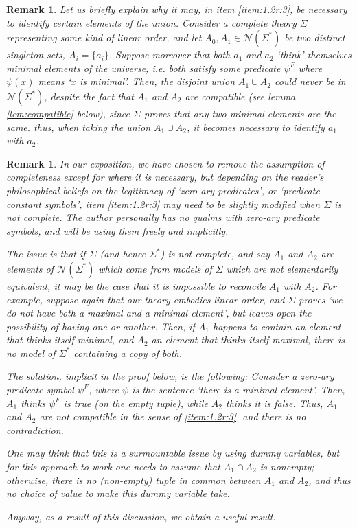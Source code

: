 \documentclass{article}
\newtheorem{remark}[theorem]{Remark}
\theoremstyle{nonumberplain}
\newcommand{\calN}{\mathcal{N}}
\begin{document}
\begin{remark}\label{rmk:whyid}
Let us briefly explain why it may, in item \ref{item:1.2r:3}, be necessary to identify certain elements of the union. Consider a complete theory $\Sigma$ representing some kind of linear order, and let $A_0, A_1 \in \calN(\Sigma^*)$ be two distinct singleton sets, $A_i = \{a_i\}$. Suppose moreover that both $a_1$ and $a_2$ `think' themselves minimal elements of the universe, i.e. both satisfy some predicate $\psi^F$ where $\psi(x)$ means `$x$ is minimal'. Then, the disjoint union $A_1 \cup A_2$ could never be in $\calN(\Sigma^*)$, despite the fact that $A_1$ and $A_2$ are compatible (see lemma \ref{lem:compatible} below), since $\Sigma$ proves that any two minimal elements are the same. thus, when taking the union $A_1 \cup A_2$, it becomes necessary to identify $a_1$ with $a_2$.
\end{remark}

\begin{remark}\label{rmk:compatible}
In our exposition, we have chosen to remove the assumption of completeness except for where it is necessary, but depending on the reader's philosophical beliefs on the legitimacy of `zero-ary predicates', or `predicate constant symbols', item \ref{item:1.2r:3} may need to be slightly modified when $\Sigma$ is not complete. The author personally has no qualms with zero-ary predicate symbols, and will be using them freely and implicitly.

The issue is that if $\Sigma$ (and hence $\Sigma^*$) is not complete, and say $A_1$ and $A_2$ are elements of $\calN(\Sigma^*)$ which come from models of $\Sigma$ which are \emph{not} elementarily equivalent, it may be the case that it is impossible to reconcile $A_1$ with $A_2$. For example, suppose again that our theory embodies linear order, and $\Sigma$ proves `we do not have both a maximal and a minimal element', but leaves open the possibility of having one or another. Then, if $A_1$ happens to contain an element that thinks itself minimal, and $A_2$ an element that thinks itself maximal, there is no model of $\Sigma^*$ containing a copy of both.

The solution, implicit in the proof below, is the following: Consider a zero-ary predicate symbol $\psi^F$, where $\psi$ is the sentence `there is a minimal element'. Then, $A_1$ thinks $\psi^F$ is true (on the empty tuple), while $A_2$ thinks it is false. Thus, $A_1$ and $A_2$ are not compatible in the sense of \ref{item:1.2r:3}, and there is no contradiction.

One may think that this is a surmountable issue by using dummy variables, but for this approach to work one needs to assume that $A_1 \cap A_2$ is nonempty; otherwise, there is no (non-empty) tuple in common between $A_1$ and $A_2$, and thus no choice of value to make this dummy variable take.

Anyway, as a result of this discussion, we obtain a useful result.
\end{remark}
\end{document}
